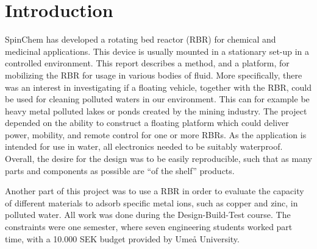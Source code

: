 \section{Introduction}

SpinChem\textsuperscript{\textregistered} has developed a rotating bed reactor (RBR) for chemical and medicinal
applications. This device is usually mounted in a stationary set-up in a
controlled environment. This report describes a method, and a platform, for
mobilizing the RBR for usage in various bodies of fluid. More specifically,
there was an interest in investigating if a floating vehicle, together with the RBR,
could be used for cleaning polluted waters in our environment. This can for example be heavy metal
polluted lakes or ponds created by the mining industry. The project depended on
the ability to construct a floating platform which could deliver power,
mobility, and remote control for one or more RBRs. As the application is intended for
use in water, all electronics needed to be suitably waterproof. Overall, the
desire for the design was to be easily reproducible, such that as many parts and components as
possible are ``of the shelf'' products.

Another part of this project was to use a RBR in order to evaluate the capacity of
different materials to adsorb specific metal ions, such as copper and zinc, in
polluted water. All work was done during the Design-Build-Test course. The constraints were one semester, where seven engineering students worked
part time, with a 10.000 SEK budget provided by Umeå University.
